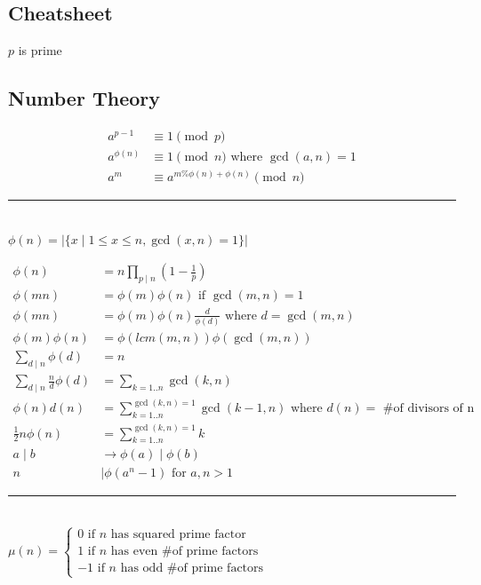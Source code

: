 \documentclass[10pt,letterpaper,landscape]{article}
\begin{document}
\begin{multicols}{2}
\newpage

\section{Cheatsheet}

$p$ is prime

\subsection{Number Theory}

\begin{align*}
	a^{p-1} &\equiv 1 \pmod{p} \\ %
	a^{\phi(n)} &\equiv 1 \pmod{n} \text{ where } \gcd(a,n) = 1 \\ %
	a^m &\equiv a^{m \% \phi(n) + \phi(n)} \pmod{n}
\end{align*}

\noindent\rule{\linewidth}{1pt}

 \\ $\phi(n) = |\{x \mid 1 \le x \le n, \gcd(x,n) = 1\}|$

\begin{align*}
	\phi(n) &= n \prod_{p \mid n}{(1 - \frac{1}{p})} \\
	\phi(mn) &= \phi(m) \phi(n) \text{ if } \gcd(m, n) = 1 \\
	\phi(mn) &= \phi(m) \phi(n) \frac{d}{\phi(d)} \text{ where } d = \gcd(m, n) \\
	\phi(m) \phi(n) &= \phi(lcm(m,n)) \phi(\gcd(m,n)) \\
	\sum_{d \mid n}{\phi(d)} &= n \\
	\sum_{d \mid n}{\frac{n}{d} \phi(d)} &= \sum_{k=1..n}{\gcd(k, n)} \\
	\phi(n) d(n) &= \sum_{k=1..n}^{\gcd(k,n)=1}{\gcd(k-1, n)} \text{ where } d(n) = \text{ \# of divisors of n }\\
	\frac{1}{2} n \phi(n) &= \sum_{k=1..n}^{\gcd(k,n)=1}{k} \\
	a \mid b &\rightarrow \phi(a) \mid \phi(b) \\
	n &\mid \phi(a^n - 1) \text{ for } a,n > 1
\end{align*}

\noindent\rule{\linewidth}{1pt}

 \\ $\mu(n) = \begin{cases} 0 \text{ if $n$ has squared prime factor} \\ 1 \text{ if $n$ has even \# of prime factors} \\ -1 \text{ if $n$ has odd \# of prime factors} \end{cases}$


\end{multicols}
\end{document}
